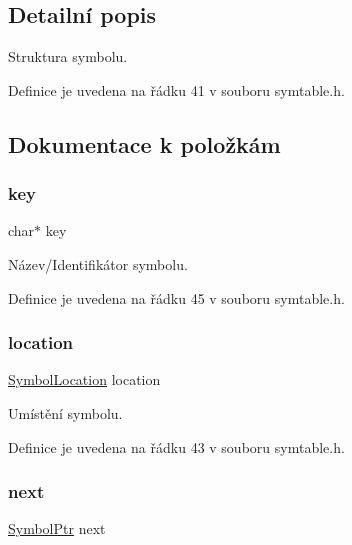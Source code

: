 \subsection{Detailní popis}
Struktura symbolu. 

Definice je uvedena na řádku 41 v souboru symtable.\+h.



\subsection{Dokumentace k položkám}
\mbox{\label{struct_s___symbol_a5892a9181e6a332f84d27aecd41dcd12}} 
\subsubsection{\texorpdfstring{key}{key}}
{\footnotesize\ttfamily char$\ast$ key}



Název/\+Identifikátor symbolu. 



Definice je uvedena na řádku 45 v souboru symtable.\+h.

\mbox{\label{struct_s___symbol_a07f3be77650617b18af2e0441d4b2cc2}} 
\subsubsection{\texorpdfstring{location}{location}}
{\footnotesize\ttfamily \hyperlink{symtable_8h_af810c55aa1b6968bd104b1babca10999}{Symbol\+Location} location}



Umístění symbolu. 



Definice je uvedena na řádku 43 v souboru symtable.\+h.

\mbox{\label{struct_s___symbol_a6ff951b53c04f7b21152a91f52caaf32}} 
\subsubsection{\texorpdfstring{next}{next}}
{\footnotesize\ttfamily \hyperlink{symtable_8h_ae75ae77f6060003cdcf7bd31d2c972f2}{Symbol\+Ptr} next}



